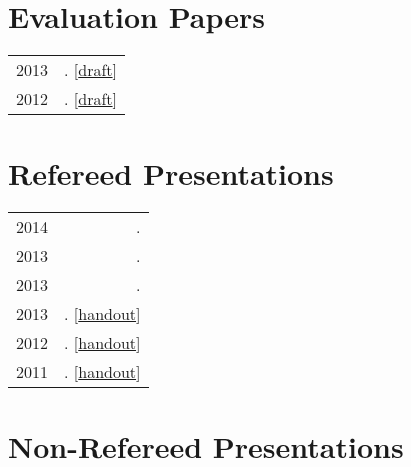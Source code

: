 \documentclass[letterpaper]{article}
\makeatletter
\newcommand{\myvrule}{\color{lightgray}\vrule width 1.0pt}
\newenvironment{cvsection}{%
  \renewcommand{\arraystretch}{1.75}
  \begin{longtable}[l]{@{} L R @{}}
}{%
  \end{longtable}
}
\makeatother
\begin{document}
\section*{Evaluation Papers}

\begin{cvsection}
  2013 & \null{}.
  [\href{http://people.linguistics.mcgill.ca/~brian.buccola/files/buccola2013-eval2.pdf}{draft}] \\

  2012 & \null{}.
  [\href{http://people.linguistics.mcgill.ca/~brian.buccola/files/buccola2012-eval1.pdf}{draft}] \\
\end{cvsection}



\section*{Refereed Presentations}

\begin{cvsection}
  2014 & \null{}. \\
  2013 & \null{}. \\
  2013 & \null{}. \\
  2013 & \null{}.
  [\href{http://people.linguistics.mcgill.ca/~brian.buccola/files/buccola2013-mot.pdf}{handout}] \\

  2012 & \null{}.
  [\href{http://people.linguistics.mcgill.ca/~brian.buccola/files/buccola2012-tom5.pdf}{handout}] \\

  2011 & \null{}.
  [\href{http://people.linguistics.mcgill.ca/~brian.buccola/files/buccola2011-tom4.pdf}{handout}] \\
\end{cvsection}



\section*{Non-Refereed Presentations}
\end{document}
